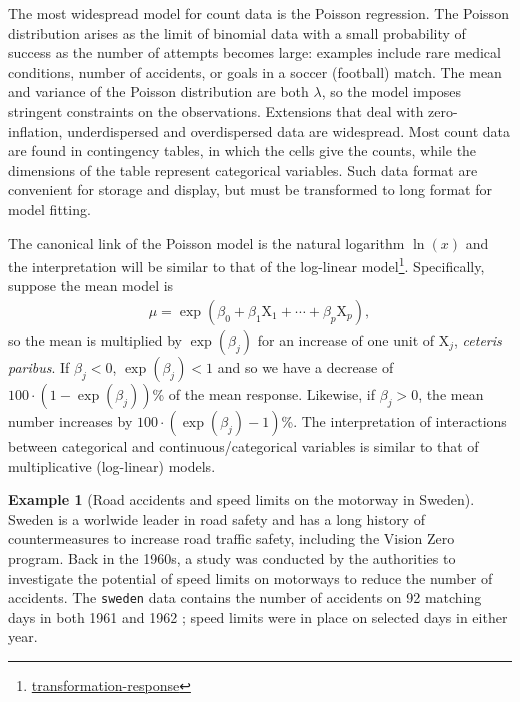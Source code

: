 \documentclass[
  11pt,
  letterpaper,
]{book}
\renewcommand{\href}[2]{#2\footnote{\url{#1}}}
\theoremstyle{definition}
\theoremstyle{definition}
\newtheorem{example}{Example}[chapter]
\theoremstyle{definition}
\theoremstyle{remark}
\begin{document}
The most widespread model for count data is the Poisson regression. The Poisson distribution arises as the limit of binomial data with a small probability of success as the number of attempts becomes large: examples include rare medical conditions, number of accidents, or goals in a soccer (football) match. The mean and variance of the Poisson distribution are both \(\lambda\), so the model imposes stringent constraints on the observations. Extensions that deal with zero-inflation, underdispersed and overdispersed data are widespread. Most count data are found in contingency tables, in which the cells give the counts, while the dimensions of the table represent categorical variables. Such data format are convenient for storage and display, but must be transformed to long format for model fitting.

The canonical link of the Poisson model is the natural logarithm \(\ln(x)\) and the interpretation will be similar to that of the \href{transformation-response}{log-linear model}. Specifically, suppose the
mean model is
\begin{align*}
\mu = \exp(\beta_0 + \beta_1 \mathrm{X}_{1} + \cdots + \beta_p \mathrm{X}_{p}),
\end{align*}
so the mean is multiplied by \(\exp(\beta_j)\) for an increase of one unit of \(\mathrm{X}_{j}\), \emph{ceteris paribus}. If \(\beta_j < 0\), \(\exp(\beta_j) < 1\) and so we have a decrease of \(100\cdot(1-\exp(\beta_j))\)\% of the mean response. Likewise, if \(\beta_j>0\), the mean number increases by \(100\cdot(\exp(\beta_j)-1)\)\%. The interpretation of interactions between categorical and continuous/categorical variables is similar to that of multiplicative (log-linear) models.

\begin{example}[Road accidents and speed limits on the motorway in Sweden]
\protect\hypertarget{exm:roadsweden}{}{\label{exm:roadsweden} {} }Sweden is a worlwide leader in road safety and has a long history of countermeasures to increase road traffic safety, including the Vision Zero program. Back in the 1960s, a study was conducted by the authorities to investigate the potential of speed limits on motorways to reduce the number of accidents. The \texttt{sweden} data contains the number of accidents on 92 matching days in both 1961 and 1962 \citep{Svensson:1981}; speed limits were in place on selected days in either year.
\end{example}
\end{document}
